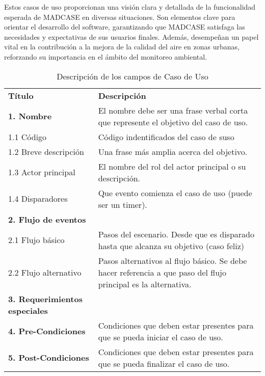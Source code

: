 \documentclass[
11pt, %
codirector, %
]{charter}
\newcounter{reqCounter}
\begin{document}
Estos casos de uso proporcionan una visión clara y detallada de la funcionalidad esperada de MADCASE en diversas situaciones. Son elementos clave para orientar el desarrollo del software, garantizando que MADCASE satisfaga las necesidades y expectativas de sus usuarios finales. Además, desempeñan un papel vital en la contribución a la mejora de la calidad del aire en zonas urbanas, reforzando su importancia en el ámbito del monitoreo ambiental.

\bigskip  \bigskip

\begin{table}[h!]
	\caption{Descripción de los campos de Caso de Uso}
	\centering
	\begin{tabular}{ | m{4.1cm} | m{10cm} | }
		\hline
		\rowcolor{gray!50} %
		\textbf{Título} & \textbf{Descripción} \\ %
		\textbf{1. Nombre} & El nombre debe ser una frase verbal corta que represente el objetivo del caso de uso. \\
		1.1 Código & Código indentificados del caso de suso \\
		1.2 Breve descripción & Una frase más amplia acerca del objetivo. \\
		1.3 Actor principal & El nombre del rol del actor principal o su descripción. \\
		1.4 Disparadores & Que evento comienza el caso de uso (puede ser un timer). \\ \hline
		\textbf{2. Flujo de eventos} &  \\
		2.1 Flujo básico & Pasos del escenario. Desde que es disparado hasta que alcanza su objetivo (caso feliz) \\
		2.2 Flujo alternativo & Pasos alternativos al flujo básico. Se debe hacer referencia a que paso del flujo principal es la alternativa. \\ \hline
		\textbf{3. Requerimientos especiales} & \\ \hline
		\textbf{4. Pre-Condiciones} & Condiciones que deben estar presentes para que se pueda iniciar el caso de uso. \\ \hline
		\textbf{5. Post-Condiciones} & Condiciones que deben estar presentes para que se pueda finalizar el caso de uso. \\ \hline
	\end{tabular}
	
\end{table}


\end{document}
